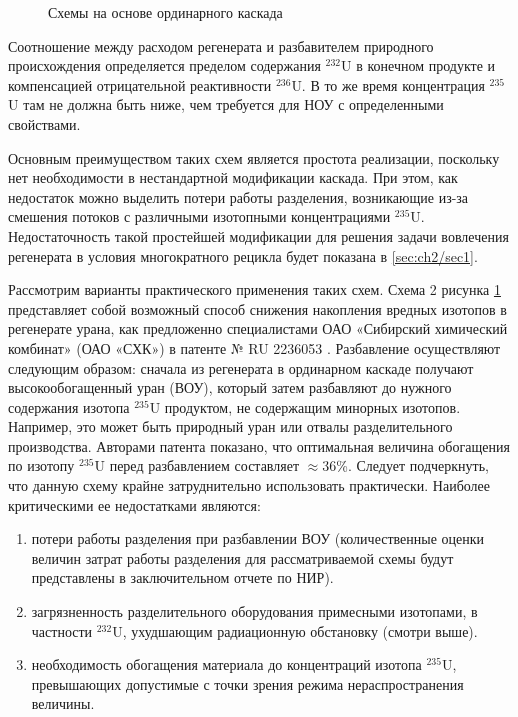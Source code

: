 \begin{figure}[ht]
  \caption{Схемы на основе ординарного каскада}\label{fig:diagram1}
\end{figure}

Соотношение между расходом регенерата и разбавителем природного происхождения определяется пределом содержания $^{232}$U в конечном продукте и компенсацией отрицательной реактивности $^{236}$U. В то же время концентрация $^{235}$U там не должна быть ниже, чем требуется для НОУ с определенными свойствами.

Основным преимуществом таких схем является простота реализации, поскольку нет необходимости в нестандартной модификации каскада. При этом, как недостаток можно выделить потери работы разделения, возникающие из-за смешения потоков с различными изотопными концентрациями $^{235}$U. 
Недостаточность такой простейшей модификации для решения задачи вовлечения регенерата в условия многократного рецикла будет показана в \ref{sec:ch2/sec1}.

Рассмотрим варианты практического применения таких схем. Схема 2 рисунка \ref{fig:diagram1} представляет собой возможный способ снижения накопления вредных изотопов в регенерате урана, как предложенно специалистами ОАО «Сибирский химический комбинат» (ОАО «СХК») в патенте № RU 2236053 \cite{SposobIzotopnogoVosstanovleniyaa}. Разбавление осуществляют следующим образом: сначала из регенерата в ординарном каскаде получают высокообогащенный уран (ВОУ), который затем разбавляют до нужного содержания изотопа $^{235}$U продуктом, не содержащим минорных изотопов. Например, это может быть природный уран или отвалы разделительного производства. Авторами патента показано, что оптимальная величина обогащения по изотопу $^{235}$U перед разбавлением составляет $\approx$36\%. Следует подчеркнуть, что данную схему крайне затруднительно использовать практически. Наиболее критическими ее недостатками являются: 
\begin{enumerate}
  \item потери работы разделения при разбавлении ВОУ (количественные оценки величин затрат работы разделения для рассматриваемой схемы будут представлены в заключительном отчете по НИР).
  \item загрязненность разделительного оборудования примесными изотопами, в частности $^{232}$U, ухудшающим радиационную обстановку (смотри выше).
  \item необходимость обогащения материала до концентраций изотопа $^{235}$U, превышающих допустимые с точки зрения режима нераспространения величины.
\end{enumerate}

